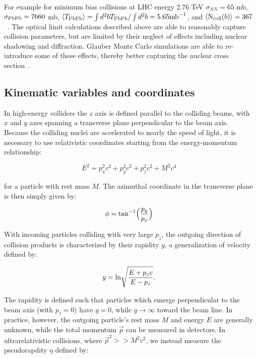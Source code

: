 \noindent For example for minimum bias collisions at LHC energy 2.76 TeV $\sigma_{NN} = 65$ mb, $\sigma_{\rm PbPb} = 7660$ mb, $\langle T_{\rm PbPb} \rangle = \int d^2 b T_{\rm PbPb} / \int d^2 b = 5.65 {\rm mb}^{-1}$, and $\langle {\rm N_{coll}}(b) \rangle = 367$~\cite{Miller:2007ri, dEnterria:2003xac}.  The optical limit calculations described above are able to reasonably capture collision parameters, but are limited by their neglect of effects including nuclear shadowing and diffraction.  Glauber Monte Carlo simulations are able to re-introduce some of these effects, thereby better capturing the nuclear cross section~\cite{Miller:2007ri, Majumder:2010qh}.  

\subsection{Kinematic variables and coordinates}

In high-energy colliders the $z$ axis is defined parallel to the colliding beams, with $x$ and $y$ axes spanning a transverse plane perpendicular to the beam axis.  Because the colliding nuclei are accelerated to nearly the speed of light, it is necessary to use relativistic coordinates starting from the energy-momentum relationship:

\begin{equation}
\label{eq:energy_momentum}
E^{2} = p_{x}^{2}c^{2}+p_{y}^{2}c^{2}+p_{z}^{2}c^{2}+M^{2}c^{4}
\end{equation}

\noindent for a particle with rest mass $M$.  The azimuthal coordinate in the transverse plane is then simply given by: 

\begin{equation}
\label{eq:phi}
\phi = {\rm tan}^{-1}\Big(\frac{p_{y}}{p_{x}}\Big)
\end{equation}

\noindent With incoming particles colliding with very large $p_{z}$, the outgoing direction of collision products is characterized by their rapidity $y$, a generalization of velocity defined by: 

\begin{equation}
\label{eq:rapidity}
y = {\rm ln} \sqrt{\frac{E+p_{z}c}{E-p_{z}}},
\end{equation}

\noindent The rapidity is defined such that particles which emerge perpendicular to the beam axis (with $p_{z}=0$) have $y = 0$, while $y \rightarrow \infty$ toward the beam line.  In practice, however, the outgoing particle's rest mass $M$ and energy $E$ are generally unknown, while the total momentum $\vec{p}$ can be measured in detectors.  In ultrarelativistic collisions, where $\vec{p}^{2} > > M^2c^2$, we instead measure the pseudorapdity $\eta$ defined by: 

